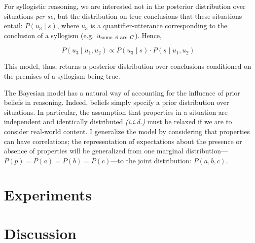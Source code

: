 \documentclass[floatsintext, man]{apa6}
\begin{document}
For syllogistic reasoning, we are interested not in the posterior distribution over situations \emph{per se}, but the distribution on true conclusions that these situations entail: $P(u_3 \mid s)$, where $u_3$ is a quantifier-utterance corresponding to the conclusion of a syllogism (e.g. $u_{\textrm{some  \emph{A} are \emph{C}}}$). Hence,

$$
P(u_3 \mid u_1, u_2) \propto P(u_3\mid s) \cdot P(s \mid u_1, u_2)
$$


This model, thus, returns a posterior distribution over conclusions conditioned on the premises of a syllogism being true.


The Bayesian model has a natural way of accounting for the influence of prior beliefs in reasoning. Indeed, beliefs simply specify a prior distribution over situations. In particular, the assumption that properties in a situation are independent and identically distributed \emph{(i.i.d.)} must be relaxed if we are to consider real-world content. I generalize the model by considering that properties can have correlations; the representation of expectations about the presence or absence of properties will be generalized from one marginal distribution---$P(p)=P(a)=P(b)=P(c)$---to the joint distribution: $P(a, b, c)$.



\section{Experiments}

\section{Discussion}


\newpage



\end{document}
